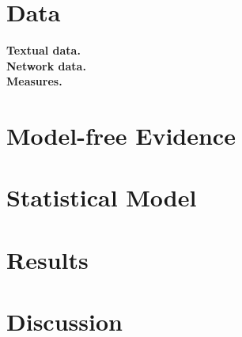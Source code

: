 \section{Data}
\textbf{Textual data.}\\
\textbf{Network data.}\\
\textbf{Measures.}\\
\section{Model-free Evidence}
\section{Statistical Model}
\section{Results}
\section{Discussion}